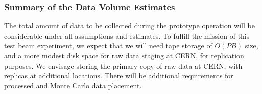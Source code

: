 \subsubsection{Summary of the Data Volume Estimates}
The total amount of data to be collected during the prototype operation will be considerable under all assumptions and estimates.
To fulfill the mission of this test beam experiment, we expect that we will need tape storage of $O(PB)$ size,
and a more modest disk space for raw data staging at CERN, for replication purposes. We envisage storing the primary copy of raw data
at CERN, with replicas at additional locations. There will be additional requirements for processed and Monte Carlo data placement.



